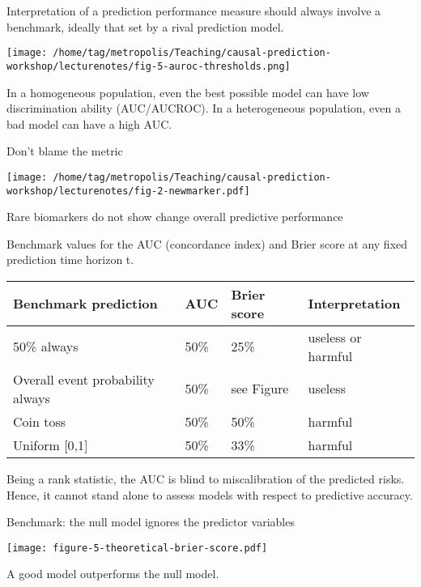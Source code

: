 \documentclass{beamer}\usepackage{listings}
\begin{document}
\begin{frame}[label={sec:orga870afd}]{}
Interpretation of a prediction performance measure should always
involve a benchmark, ideally that set by a rival prediction model.
\vfill

\begin{center}
\texttt{[image: /home/tag/metropolis/Teaching/causal-prediction-workshop/lecturenotes/fig-5-auroc-thresholds.png]}
\label{fig:1}
\end{center}

In a homogeneous population, even the best possible model can have low
discrimination ability (AUC/AUCROC). In a heterogeneous population, even a
bad model can have a high AUC.
\end{frame}
\begin{frame}[label={sec:org2b8844c}]{Don't blame the metric}
\begin{center}
\texttt{[image: /home/tag/metropolis/Teaching/causal-prediction-workshop/lecturenotes/fig-2-newmarker.pdf]}
\end{center}

Rare biomarkers do not show change \alert{overall} predictive performance 
\end{frame}
\begin{frame}[label={sec:org93c0dd7}]{}
Benchmark values for the AUC (concordance index) and Brier score at any fixed prediction time horizon t.

\begin{center}
\begin{tabular}{llll}
Benchmark prediction & AUC & Brier score & Interpretation\\
\hline
50\% always & 50\% & 25\% & useless or harmful\\
Overall event probability always & 50\% & see Figure & useless\\
Coin toss & 50\% & 50\% & harmful\\
Uniform [0,1] & 50\% & 33\% & harmful\\
\end{tabular}
\end{center}

Being a rank statistic, the AUC is blind to
miscalibration of the predicted risks.
Hence, it cannot stand alone to assess models with respect to predictive accuracy.
\end{frame}
\begin{frame}[label={sec:orgd5c5a78}]{Benchmark: the null model ignores the predictor variables}
\begin{center}
\texttt{[image: figure-5-theoretical-brier-score.pdf]}
\end{center}

A good model outperforms the null model.
\end{frame}
\end{document}

